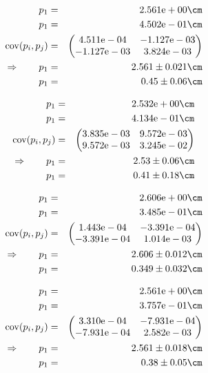 \begin{eqnarray}
    p_1 &=& 2.561\mathrm{e}+00 \cm \nonumber \\
    p_1 &=& 4.502\mathrm{e}-01 \cm \nonumber \\
    \mathrm{cov}(p_i, p_j) &=& 
    \begin{pmatrix}
        4.511\mathrm{e}-04 &-1.127\mathrm{e}-03 \\
        -1.127\mathrm{e}-03 &3.824\mathrm{e}-03 \\
    \end{pmatrix}
\\ \Rightarrow \qquad
    p_1 &=& 2.561 \pm 0.021 \cm\\
    p_1 &=& 0.45 \pm 0.06 \cm
\end{eqnarray}

\begin{eqnarray}
    p_1 &=& 2.532\mathrm{e}+00 \cm \nonumber \\
    p_1 &=& 4.134\mathrm{e}-01 \cm \nonumber \\
    \mathrm{cov}(p_i, p_j) &=& 
    \begin{pmatrix}
        3.835\mathrm{e}-03 &9.572\mathrm{e}-03 \\
        9.572\mathrm{e}-03 &3.245\mathrm{e}-02 \\
    \end{pmatrix}
\\ \Rightarrow \qquad
    p_1 &=& 2.53 \pm 0.06 \cm\\
    p_1 &=& 0.41 \pm 0.18 \cm
\end{eqnarray}

\begin{eqnarray}
    p_1 &=& 2.606\mathrm{e}+00 \cm \nonumber \\
    p_1 &=& 3.485\mathrm{e}-01 \cm \nonumber \\
    \mathrm{cov}(p_i, p_j) &=& 
    \begin{pmatrix}
        1.443\mathrm{e}-04 &-3.391\mathrm{e}-04 \\
        -3.391\mathrm{e}-04 &1.014\mathrm{e}-03 \\
    \end{pmatrix}
\\ \Rightarrow \qquad
    p_1 &=& 2.606 \pm 0.012 \cm\\
    p_1 &=& 0.349 \pm 0.032 \cm
\end{eqnarray}

\begin{eqnarray}
    p_1 &=& 2.561\mathrm{e}+00 \cm \nonumber \\
    p_1 &=& 3.757\mathrm{e}-01 \cm \nonumber \\
    \mathrm{cov}(p_i, p_j) &=& 
    \begin{pmatrix}
        3.310\mathrm{e}-04 &-7.931\mathrm{e}-04 \\
        -7.931\mathrm{e}-04 &2.582\mathrm{e}-03 \\
    \end{pmatrix}
\\ \Rightarrow \qquad
    p_1 &=& 2.561 \pm 0.018 \cm\\
    p_1 &=& 0.38 \pm 0.05 \cm
\end{eqnarray}

